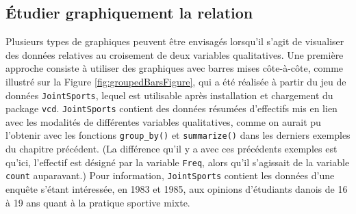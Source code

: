 \documentclass[
  french,
]{book}
\begin{document}
\hypertarget{uxe9tudier-graphiquement-la-relation-1}{%
\subsection{Étudier graphiquement la relation}\label{uxe9tudier-graphiquement-la-relation-1}}

Plusieurs types de graphiques peuvent être envisagés lorsqu'il s'agit de visualiser des données relatives au croisement de deux variables qualitatives. Une première approche consiste à utiliser des graphiques avec barres mises côte-à-côte, comme illustré sur la Figure \ref{fig:groupedBarsFigure}, qui a été réalisée à partir du jeu de données \texttt{JointSports}, lequel est utilisable après installation et chargement du package \texttt{vcd}. \texttt{JointSports} contient des données résumées d'effectifs mis en lien avec les modalités de différentes variables qualitatives, comme on aurait pu l'obtenir avec les fonctions \texttt{group\_by()} et \texttt{summarize()} dans les derniers exemples du chapitre précédent. (La différence qu'il y a avec ces précédents exemples est qu'ici, l'effectif est désigné par la variable \texttt{Freq}, alors qu'il s'agissait de la variable \texttt{count} auparavant.) Pour information, \texttt{JointSports} contient les données d'une enquête s'étant intéressée, en 1983 et 1985, aux opinions d'étudiants danois de 16 à 19 ans quant à la pratique sportive mixte.
\end{document}
